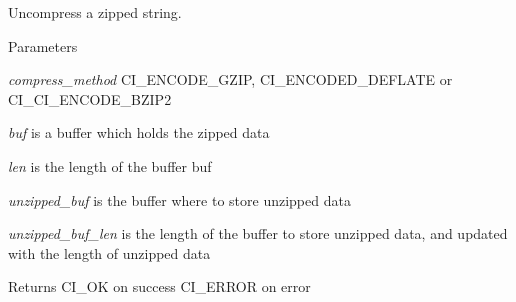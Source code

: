 Uncompress a zipped string. 
\begin{DoxyParams}{Parameters}
\item[{\em compress\_\-method}]CI\_\-ENCODE\_\-GZIP, CI\_\-ENCODED\_\-DEFLATE or CI\_\-CI\_\-ENCODE\_\-BZIP2 \item[{\em buf}]is a buffer which holds the zipped data \item[{\em len}]is the length of the buffer buf \item[{\em unzipped\_\-buf}]is the buffer where to store unzipped data \item[{\em unzipped\_\-buf\_\-len}]is the length of the buffer to store unzipped data, and updated with the length of unzipped data \end{DoxyParams}
\begin{DoxyReturn}{Returns}
CI\_\-OK on success CI\_\-ERROR on error 
\end{DoxyReturn}
